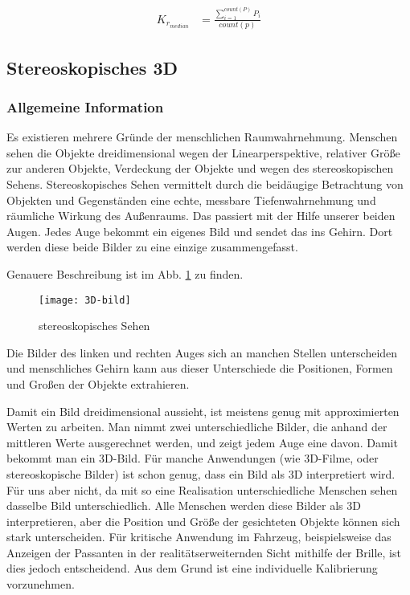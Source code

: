 \begin{align}
K_{r_{median}} &= \frac{\sum\limits_{i=1}^{count(P)} P_i}{count(p)} 
\end{align}


\subsection{Stereoskopisches 3D}
\label{sec:Stereoskopisches 3D}
\subsubsection{Allgemeine Information}
Es existieren mehrere Gründe der menschlichen Raumwahrnehmung.
Menschen sehen die Objekte dreidimensional wegen der Linearperspektive, relativer Größe zur anderen Objekte, Verdeckung der Objekte und wegen des stereoskopischen Sehens. 
Stereoskopisches Sehen vermittelt durch die beidäugige Betrachtung von Objekten und Gegenständen eine echte, messbare Tiefenwahrnehmung und räumliche Wirkung des Außenraums. 
Das passiert mit der Hilfe unserer beiden Augen.
Jedes Auge bekommt ein eigenes Bild und sendet das ins Gehirn. 
Dort werden diese beide Bilder zu eine einzige zusammengefasst.

Genauere Beschreibung ist im Abb. \ref{fig:3D} zu finden.

\begin{figure}[h]
   \centering
   \texttt{[image: 3D-bild]}
   \caption{stereoskopisches Sehen}
   \label{fig:3D}
\end{figure}

Die Bilder des linken und rechten Auges sich an manchen Stellen unterscheiden und menschliches Gehirn kann aus dieser Unterschiede die Positionen, Formen und Großen der Objekte extrahieren.

Damit ein Bild dreidimensional aussieht, ist meistens genug mit approximierten Werten zu arbeiten.
Man nimmt zwei unterschiedliche Bilder, die anhand der mittleren Werte ausgerechnet werden, und zeigt jedem Auge eine davon. 
Damit bekommt man ein 3D-Bild. 
Für manche Anwendungen (wie 3D-Filme, oder stereoskopische Bilder) ist schon genug,  dass ein Bild als 3D interpretiert wird. 
Für uns aber nicht, da mit so eine Realisation unterschiedliche Menschen sehen dasselbe Bild unterschiedlich.
Alle Menschen werden diese Bilder als 3D interpretieren, aber die Position und Größe der gesichteten Objekte können sich stark unterscheiden. Für kritische Anwendung im Fahrzeug, beispielsweise das Anzeigen der Passanten in der realitätserweiternden Sicht mithilfe der Brille, ist dies jedoch entscheidend. Aus dem Grund ist eine individuelle Kalibrierung vorzunehmen.


